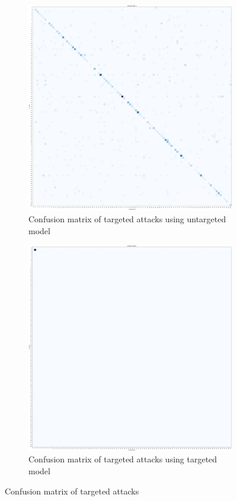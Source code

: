 \begin{figure}[t]
    \centering
    \begin{subfigure}[b]{0.4\textwidth}
        \includegraphics[width=\textwidth]{./fig/conf_mat_cnn_knn.png}
        \caption{Confusion matrix of targeted attacks using untargeted model}
        \label{fig:conf_mat_cnn_knn}
    \end{subfigure}
    \qquad
    \begin{subfigure}[b]{0.4\textwidth}
        \includegraphics[width=\textwidth]{./fig/conf_mat_cnn_knn_targeted.png}
        \caption{Confusion matrix of targeted attacks using targeted model}
        \label{fig:conf_mat_cnn}
    \end{subfigure}
    \caption{Confusion matrix of targeted attacks}
    \label{fig:confusion_matrices}
\end{figure}
